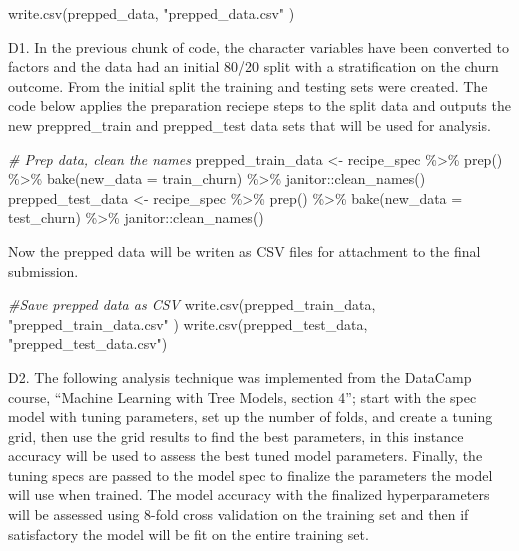 \documentclass[
]{article}
\newenvironment{Shaded}{\begin{snugshade}}{\end{snugshade}}
\newcommand{\AttributeTok}[1]{\textcolor[rgb]{0.77,0.63,0.00}{#1}}
\newcommand{\CommentTok}[1]{\textcolor[rgb]{0.56,0.35,0.01}{\textit{#1}}}
\newcommand{\FunctionTok}[1]{\textcolor[rgb]{0.00,0.00,0.00}{#1}}
\newcommand{\NormalTok}[1]{#1}
\newcommand{\OtherTok}[1]{\textcolor[rgb]{0.56,0.35,0.01}{#1}}
\newcommand{\SpecialCharTok}[1]{\textcolor[rgb]{0.00,0.00,0.00}{#1}}
\newcommand{\StringTok}[1]{\textcolor[rgb]{0.31,0.60,0.02}{#1}}
\begin{document}
\begin{Shaded}
\begin{Highlighting}[]
\FunctionTok{write.csv}\NormalTok{(prepped\_data, }\StringTok{"prepped\_data.csv"}\NormalTok{ )}
\end{Highlighting}
\end{Shaded}

D1. In the previous chunk of code, the character variables have been
converted to factors and the data had an initial 80/20 split with a
stratification on the churn outcome. From the initial split the training
and testing sets were created. The code below applies the preparation
reciepe steps to the split data and outputs the new preppred\_train and
prepped\_test data sets that will be used for analysis.

\begin{Shaded}
\begin{Highlighting}[]
\CommentTok{\# Prep data, clean the names}
\NormalTok{prepped\_train\_data }\OtherTok{\textless{}{-}}\NormalTok{ recipe\_spec }\SpecialCharTok{\%\textgreater{}\%} \FunctionTok{prep}\NormalTok{() }\SpecialCharTok{\%\textgreater{}\%} \FunctionTok{bake}\NormalTok{(}\AttributeTok{new\_data =}\NormalTok{ train\_churn) }\SpecialCharTok{\%\textgreater{}\%}\NormalTok{ janitor}\SpecialCharTok{::}\FunctionTok{clean\_names}\NormalTok{()}
\NormalTok{prepped\_test\_data }\OtherTok{\textless{}{-}}\NormalTok{ recipe\_spec }\SpecialCharTok{\%\textgreater{}\%} \FunctionTok{prep}\NormalTok{() }\SpecialCharTok{\%\textgreater{}\%} \FunctionTok{bake}\NormalTok{(}\AttributeTok{new\_data =}\NormalTok{ test\_churn) }\SpecialCharTok{\%\textgreater{}\%}\NormalTok{ janitor}\SpecialCharTok{::}\FunctionTok{clean\_names}\NormalTok{()}
\end{Highlighting}
\end{Shaded}

Now the prepped data will be writen as CSV files for attachment to the
final submission.

\begin{Shaded}
\begin{Highlighting}[]
\CommentTok{\#Save prepped data as CSV}
\FunctionTok{write.csv}\NormalTok{(prepped\_train\_data, }\StringTok{"prepped\_train\_data.csv"}\NormalTok{ )}
\FunctionTok{write.csv}\NormalTok{(prepped\_test\_data, }\StringTok{"prepped\_test\_data.csv"}\NormalTok{)}
\end{Highlighting}
\end{Shaded}

D2. The following analysis technique was implemented from the DataCamp
course, ``Machine Learning with Tree Models, section 4''; start with the
spec model with tuning parameters, set up the number of folds, and
create a tuning grid, then use the grid results to find the best
parameters, in this instance accuracy will be used to assess the best
tuned model parameters. Finally, the tuning specs are passed to the
model spec to finalize the parameters the model will use when trained.
The model accuracy with the finalized hyperparameters will be assessed
using 8-fold cross validation on the training set and then if
satisfactory the model will be fit on the entire training set.
\end{document}
